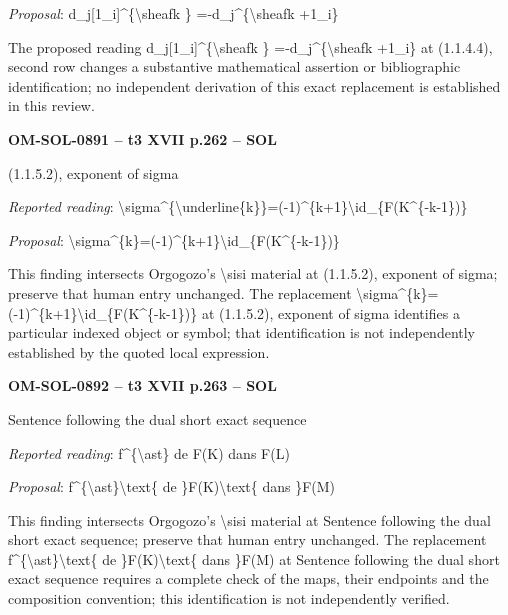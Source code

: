 \emph{Proposal}: d\_j[1\_i]\textasciicircum{}\{\textbackslash{}sheafk \} =\allowbreak  -d\_j\textasciicircum{}\{\textbackslash{}sheafk +1\_i\}\par
The proposed reading d\_j[1\_i]\textasciicircum{}\{\textbackslash{}sheafk \} =\allowbreak  -d\_j\textasciicircum{}\{\textbackslash{}sheafk +1\_i\} at (1.1.4.4), second row changes a substantive mathematical assertion or bibliographic identification; no independent derivation of this exact replacement is established in this review.\par
\par\noindent\textbf{OM-SOL-0891 -- t3 XVII p.262 -- SOL}\par
(1.1.5.2), exponent of sigma\par
\emph{Reported reading}: \textbackslash{}sigma\textasciicircum{}\{\textbackslash{}underline\{k\}\}=\allowbreak (-1)\textasciicircum{}\{k+1\}\textbackslash{}id\_\{F(K\textasciicircum{}\{-k-1\})\}\par
\emph{Proposal}: \textbackslash{}sigma\textasciicircum{}\{k\}=\allowbreak (-1)\textasciicircum{}\{k+1\}\textbackslash{}id\_\{F(K\textasciicircum{}\{-k-1\})\}\par
This finding intersects Orgogozo's \textbackslash{}sisi material at (1.1.5.2), exponent of sigma; preserve that human entry unchanged. The replacement \textbackslash{}sigma\textasciicircum{}\{k\}=\allowbreak (-1)\textasciicircum{}\{k+1\}\textbackslash{}id\_\{F(K\textasciicircum{}\{-k-1\})\} at (1.1.5.2), exponent of sigma identifies a particular indexed object or symbol; that identification is not independently established by the quoted local expression.\par
\par\noindent\textbf{OM-SOL-0892 -- t3 XVII p.263 -- SOL}\par
Sentence following the dual short exact sequence\par
\emph{Reported reading}: f\textasciicircum{}\{\textbackslash{}ast\} de F(K) dans F(L)\par
\emph{Proposal}: f\textasciicircum{}\{\textbackslash{}ast\}\textbackslash{}text\{ de \}F(K)\textbackslash{}text\{ dans \}F(M)\par
This finding intersects Orgogozo's \textbackslash{}sisi material at Sentence following the dual short exact sequence; preserve that human entry unchanged. The replacement f\textasciicircum{}\{\textbackslash{}ast\}\textbackslash{}text\{ de \}F(K)\textbackslash{}text\{ dans \}F(M) at Sentence following the dual short exact sequence requires a complete check of the maps, their endpoints and the composition convention; this identification is not independently verified.\par
